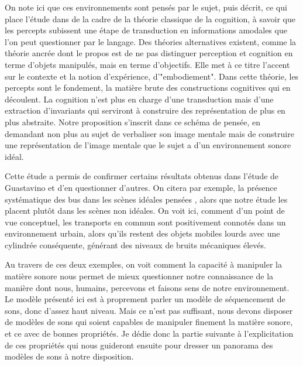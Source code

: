   On note ici que ces environnements sont pensés par le sujet, puis décrit, ce qui place l'étude dans de la cadre de la théorie classique de la cognition, à savoir que les percepts subissent une étape de transduction en informations amodales que l'on peut questionner par le langage. Des théories alternatives existent, comme la théorie ancrée \cite{barsalou2010grounded} dont le propos est de ne pas distinguer perception et cognition en terme d'objets manipulés, mais en terme d'objectifs. Elle met à ce titre l'accent sur le contexte et la notion d'expérience, d'"embodiement". Dans cette théorie, les percepts sont le fondement, la matière brute des constructions cognitives qui en découlent. La cognition n'est plus en charge d'une transduction mais d'une extraction d'invariants qui serviront à construire des représentation de plus en plus abstraite. Notre proposition s'inscrit dans ce schéma de pensée, en demandant non plus au sujet de verbaliser son image mentale mais de \og construire \fg une représentation de l'image mentale que le sujet a d'un environnement sonore idéal.

  Cette étude a permis de confirmer certains résultats obtenus dans l'étude de Guastavino \cite{guastavino2006ideal} et d'en questionner d'autres. On citera par exemple, la présence systématique des bus dans les scènes idéales \og pensées \fg, alors que notre étude les placent plutôt dans les scènes non idéales. On voit ici, comment d'un point de vue conceptuel, les transports en commun sont positivement connotés dans un environnement urbain, alors qu'ils restent des objets mobiles lourds avec une cylindrée conséquente, générant des niveaux de bruits mécaniques élevés\cite{lafayhal-01300399}.

  Au travers de ces deux exemples, on voit comment la capacité à manipuler la matière sonore nous permet de mieux questionner notre connaissance de la manière dont nous, humains, percevons et faisons sens de notre environnement. Le modèle présenté ici est à proprement parler un modèle de séquencement de sons, donc d'assez haut niveau. Mais ce n'est pas suffisant, nous devons disposer de modèles de sons qui soient capables de manipuler finement la matière sonore, et ce avec de bonnes propriétés. Je dédie donc la partie suivante à l'explicitation de ces propriétés qui nous guideront ensuite pour dresser un panorama des modèles de sons à notre disposition.
